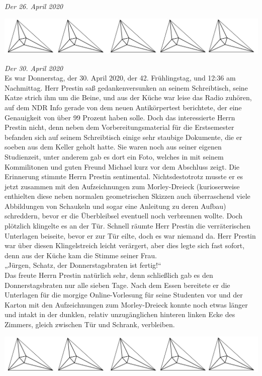 \documentclass[oneside]{memoir}
\newcommand{\parasep}{
\bigskip
\bigskip
\begin{center} 
   \includegraphics[scale=.08]{parasep5.jpg} 
\end{center}
\bigskip
\bigskip
}
\begin{document}
\textit{Der 26. April 2020} \\ 

     
\parasep

\textit{Der 30. April 2020} \\
Es war Donnerstag, der 30. April 2020, der 42. Frühlingstag, und 12:36 am Nachmittag. Herr Prestin saß gedankenversunken an seinem Schreibtisch, seine Katze strich ihm um die Beine, und aus der Küche war leise das Radio zuhören, auf dem NDR Info gerade von dem neuen Antikörpertest berichtete, der eine Genauigkeit von über 99 Prozent haben solle. Doch das interessierte Herrn Prestin nicht, denn neben dem Vorbereitungsmaterial für die Erstsemester befanden sich auf seinem Schreibtisch einige sehr staubige Dokumente, die er soeben aus dem Keller geholt hatte. Sie waren noch aus seiner eigenen Studienzeit, unter anderem gab es dort ein Foto, welches in mit seinem Kommilitonen und guten Freund Michael kurz vor dem Abschluss zeigt. Die Erinnerung stimmte Herrn Prestin sentimental. Nichtsdestotrotz musste er es jetzt zusammen mit den Aufzeichnungen zum Morley-Dreieck (kurioserweise enthielten diese neben normalen geometrischen Skizzen auch überraschend viele Abbildungen von Schaukeln und sogar eine Anleitung zu deren Aufbau) schreddern, bevor er die Überbleibsel eventuell noch verbrennen wollte. Doch plötzlich klingelte es an der Tür. Schnell räumte Herr Prestin die verräterischen Unterlagen beiseite, bevor er zur Tür eilte, doch es war niemand da. Herr Prestin war über diesen Klingelstreich leicht verärgert, aber dies legte sich fast sofort, denn aus der Küche kam die Stimme seiner Frau. \\
„Jürgen, Schatz, der Donnerstagsbraten ist fertig!“ \\
Das freute Herrn Prestin natürlich sehr, denn schließlich gab es den Donnerstagsbraten nur alle sieben Tage. Nach dem Essen bereitete er die Unterlagen für die morgige Online-Vorlesung für seine Studenten vor und der Karton mit den Aufzeichnungen zum Morley-Dreieck konnte noch etwas länger und intakt in der dunklen, relativ unzugänglichen hinteren linken Ecke des Zimmers, gleich zwischen Tür und Schrank, verbleiben. 
     
\parasep
\end{document}
